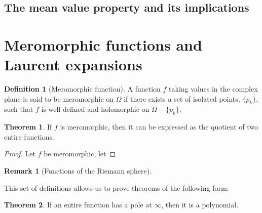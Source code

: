 \documentclass[aps,pra,showpacs,notitlepage,onecolumn,superscriptaddress,nofootinbib]{revtex4-1}
\theoremstyle{definition}
\newtheorem{definition}{Definition}[section]
\newtheorem{theorem}{Theorem}[section]
\newtheorem{remark}{Remark}[section]
\begin{document}
\subsection{The mean value property and its implications}


\section{Meromorphic functions and Laurent expansions}

\begin{definition}[Meromorphic function]
  A function $f$ taking values in the complex plane is said to be meromorphic on $\Omega$ if there exists a set of isolated points, $\{p_k\}$, such that $f$
  is well-defined and holomorphic on $\Omega - \{p_k\}$.
\end{definition}

\begin{theorem}
  If $f$ is meromorphic, then it can be expressed as the quotient of two entire functions.
\end{theorem}
\begin{proof}
  Let $f$ be meromorphic, let
\end{proof}

\begin{remark}[Functions of the Riemann sphere]
\end{remark}

\noindent This set of definitions allows us to prove theorems of the following form:

\begin{theorem}
  If an entire function has a pole at $\infty$, then it is a polynomial.
  \end{theorem}
\end{document}
